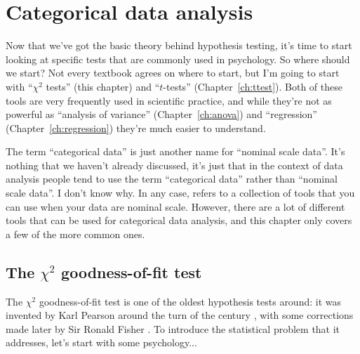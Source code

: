 
\chapter{Categorical data analysis\label{ch:chisquare}}


Now that we've got the basic theory behind hypothesis testing, it's time to start looking at specific tests that are commonly used in psychology. So where should we start? Not every textbook agrees on where to start, but I'm going to start with ``$\chi^2$ tests'' (this chapter) and ``$t$-tests'' (Chapter~\ref{ch:ttest}). Both of these tools are very frequently used in scientific practice, and while they're not as powerful as ``analysis of variance'' (Chapter~\ref{ch:anova}) and ``regression'' (Chapter~\ref{ch:regression}) they're much easier to understand.

The term ``categorical data'' is just another name for ``nominal scale data''. It's nothing that we haven't already discussed, it's just that in the context of data analysis people tend to use the term ``categorical data'' rather than ``nominal scale data''. I don't know why. In any case,  refers to a collection of tools that you can use when your data are nominal scale. However, there are a lot of different tools that can be used for categorical data analysis, and this chapter only covers a few of the more common ones.


\section{The $\chi^2$ goodness-of-fit test~\label{sec:goftest}}

The $\chi^2$ goodness-of-fit test is one of the oldest hypothesis tests around: it was invented by Karl Pearson around the turn of the century \cite{Pearson1900}, with some corrections made later by  Sir Ronald Fisher \cite{Fisher1922}. To introduce the statistical problem that it addresses, let's start with some psychology... 


